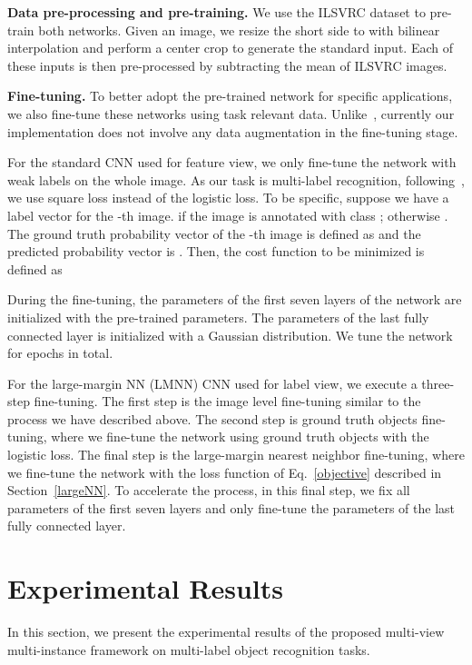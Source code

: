 \documentclass[10pt,twocolumn,letterpaper]{article}
\begin{document}
\textbf{Data pre-processing and pre-training.} We use the ILSVRC
 dataset to pre-train both networks. Given an image, we
resize the short side to  with bilinear interpolation and
perform a center crop to generate the standard 
input. Each of these inputs is then pre-processed by subtracting
the mean of ILSVRC images.

\textbf{Fine-tuning.} To better adopt the pre-trained network for
specific applications, we also fine-tune these networks using task
relevant data. Unlike~\cite{Chatfield2014}, currently our
implementation does not involve any data augmentation in the
fine-tuning stage.

For the standard CNN used for feature view, we only fine-tune the
network with weak labels on the whole image. As our task is
multi-label recognition, following~\cite{Wei2014}, we use square
loss instead of the logistic loss. To be specific, suppose we have
a label vector  for the -th image.   if the image is annotated with class ; otherwise . The ground truth probability vector of the -th image is
defined as  and
the predicted probability vector is .
Then, the cost function to be minimized is defined as

During the fine-tuning, the parameters of the first seven layers
of the network are initialized with the pre-trained parameters.
The parameters of the last fully connected layer is initialized
with a Gaussian distribution. We tune the network for  epochs
in total.

For the large-margin NN (LMNN) CNN used for label view, we execute
a three-step fine-tuning. The first step is the image level
fine-tuning similar to the process we have described above. The
second step is ground truth objects fine-tuning, where we
fine-tune the network using ground truth objects with the logistic
loss. The final step is the large-margin nearest neighbor
fine-tuning, where we fine-tune the network with the loss function
of Eq.~\ref{objective} described in Section~\ref{largeNN}. To
accelerate the process, in this final step, we fix all parameters
of the first seven layers and only fine-tune the parameters of the
last fully connected layer.

\section{Experimental Results} \label{exp}

In this section, we present the experimental results of the
proposed multi-view multi-instance framework on multi-label object
recognition tasks.
\end{document}
